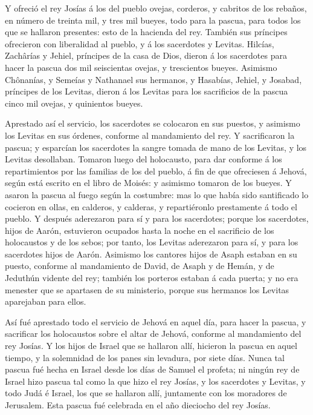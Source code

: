  Y ofreció el rey Josías á los del pueblo ovejas, corderos,
y cabritos de los rebaños, en número de treinta mil, y tres mil bueyes,
todo para la pascua, para todos los que se hallaron presentes: esto de
la hacienda del rey.  También sus príncipes ofrecieron con
liberalidad al pueblo, y á los sacerdotes y Levitas. Hilcías, Zachârías
y Jehiel, príncipes de la casa de Dios, dieron á los sacerdotes para
hacer la pascua dos mil seiscientas ovejas, y trescientos bueyes.
 Asimismo Chônanías, y Semeías y Nathanael sus hermanos, y
Hasabías, Jehiel, y Josabad, príncipes de los Levitas, dieron á los
Levitas para los sacrificios de la pascua cinco mil ovejas, y quinientos
bueyes.

 Aprestado así el servicio, los sacerdotes se colocaron en
sus puestos, y asimismo los Levitas en sus órdenes, conforme al
mandamiento del rey.  Y sacrificaron la pascua; y esparcían
los sacerdotes la sangre tomada de mano de los Levitas, y los Levitas
desollaban.  Tomaron luego del holocausto, para dar
conforme á los repartimientos por las familias de los del pueblo, á fin
de que ofreciesen á Jehová, según está escrito en el libro de Moisés: y
asimismo tomaron de los bueyes.  Y asaron la pascua al
fuego según la costumbre: mas lo que había sido santificado lo cocieron
en ollas, en calderos, y calderas, y repartiéronlo prestamente á todo el
pueblo.  Y después aderezaron para sí y para los
sacerdotes; porque los sacerdotes, hijos de Aarón, estuvieron ocupados
hasta la noche en el sacrificio de los holocaustos y de los sebos; por
tanto, los Levitas aderezaron para sí, y para los sacerdotes hijos de
Aarón.  Asimismo los cantores hijos de Asaph estaban en su
puesto, conforme al mandamiento de David, de Asaph y de Hemán, y de
Jeduthún vidente del rey; también los porteros estaban á cada puerta; y
no era menester que se apartasen de su ministerio, porque sus hermanos
los Levitas aparejaban para ellos.

 Así fué aprestado todo el servicio de Jehová en aquel día,
para hacer la pascua, y sacrificar los holocaustos sobre el altar de
Jehová, conforme al mandamiento del rey Josías.  Y los
hijos de Israel que se hallaron allí, hicieron la pascua en aquel
tiempo, y la solemnidad de los panes sin levadura, por siete días.
 Nunca tal pascua fué hecha en Israel desde los días de
Samuel el profeta; ni ningún rey de Israel hizo pascua tal como la que
hizo el rey Josías, y los sacerdotes y Levitas, y todo Judá é Israel,
los que se hallaron allí, juntamente con los moradores de Jerusalem.
 Esta pascua fué celebrada en el año dieciocho del rey
Josías.

